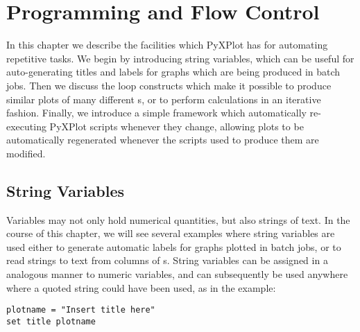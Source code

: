 %
%
%
%
%



\chapter{Programming and Flow Control}

In this chapter we describe the facilities which PyXPlot has for automating
repetitive tasks. We begin by introducing string variables, which can be useful
for auto-generating titles and labels for graphs which are being produced in
batch jobs. Then we discuss the loop constructs which make it possible to
produce similar plots of many different \datafile s, or to perform calculations
in an iterative fashion.  Finally, we introduce a simple framework which
automatically re-executing PyXPlot scripts whenever they change, allowing plots
to be automatically regenerated whenever the scripts used to produce them are
modified.

\section{String Variables}
\label{sec:stringvars}

Variables may not only hold numerical quantities, but also strings of text.  In
the course of this chapter, we will see several examples where string variables
are used either to generate automatic labels for graphs plotted in batch jobs,
or to read strings to text from columns of \datafile s. String variables can be
assigned in a analogous manner to numeric variables, and can subsequently be
used anywhere where a quoted string could have been used, as in the example:
\begin{verbatim}
plotname = "Insert title here"
set title plotname
\end{verbatim}

